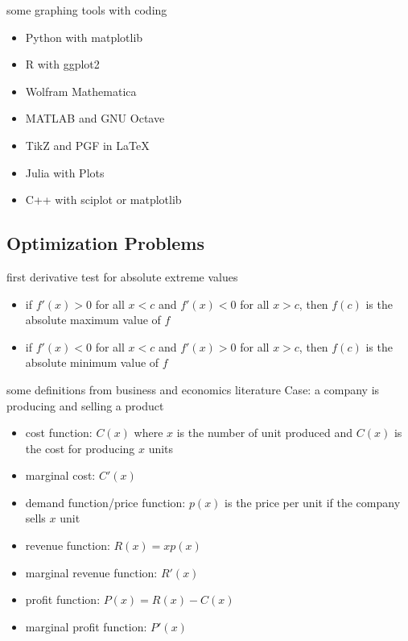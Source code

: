 \documentclass[Calculus 1 Recitation.tex]{subfiles}
\begin{document}
\begin{myleftlinebox}
	some graphing tools with coding
	\tcblower
	\begin{itemize}
		\item Python with matplotlib
		\item R with ggplot2
		\item Wolfram Mathematica
		\item MATLAB and GNU Octave 
		\item TikZ and PGF in \LaTeX
		\item Julia with Plots
		\item C++ with sciplot or matplotlib
	\end{itemize}
\end{myleftlinebox}

\subsection{Optimization Problems}
\begin{myleftlinebox}
	first derivative test for absolute extreme values
	\tcblower
	\begin{itemize}
		\item if $f'(x)>0$ for all $x<c$ and $f'(x)<0$ for all $x>c$, then $f(c)$ is the absolute maximum value of $f$
		\item if $f'(x)<0$ for all $x<c$ and $f'(x)>0$ for all $x>c$, then $f(c)$ is the absolute minimum value of $f$
	\end{itemize}
\end{myleftlinebox}

\begin{myleftlinebox}
	some definitions from business and economics literature
	\tcblower
	Case: a company is producing and selling a product
	\begin{itemize}
		\item cost function: $C(x)$ where $x$ is the number of unit produced and $C(x)$ is the cost for producing $x$ units
		\item marginal cost: $C'(x)$
		\item demand function/price function: $p(x)$ is the price per unit if the company sells $x$ unit
		\item revenue function: $R(x)=xp(x)$
		\item marginal revenue function: $R'(x)$
		\item profit function: $P(x)=R(x)-C(x)$
		\item marginal profit function: $P'(x)$
	\end{itemize}
\end{myleftlinebox}
\end{document}
